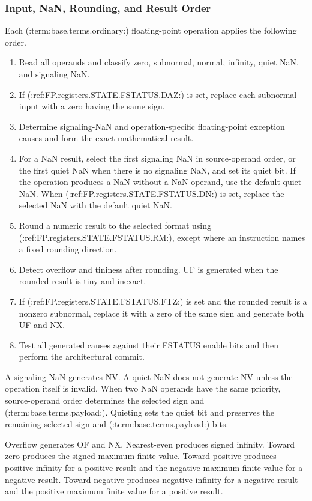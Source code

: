 \subsubsection{Input, NaN, Rounding, and Result Order}

Each (:term:base.terms.ordinary:) floating-point operation applies the following order.

\begin{enumerate}
\item Read all operands and classify zero, subnormal, normal, infinity, quiet NaN, and signaling NaN.
\item If (:ref:FP.registers.STATE.FSTATUS.DAZ:) is set, replace each subnormal input with a zero having the same sign.
\item Determine signaling-NaN and operation-specific floating-point exception causes and form the exact mathematical result.
\item For a NaN result, select the first signaling NaN in source-operand order, or the first quiet NaN when there is
no signaling NaN, and set its quiet bit. If the operation produces a NaN without a NaN operand, use the default
quiet NaN. When (:ref:FP.registers.STATE.FSTATUS.DN:) is set, replace the selected NaN with the default quiet NaN.
\item Round a numeric result to the selected format using (:ref:FP.registers.STATE.FSTATUS.RM:), except where an instruction names a
fixed rounding direction.
\item Detect overflow and tininess after rounding. UF is generated when the rounded result is tiny and inexact.
\item If (:ref:FP.registers.STATE.FSTATUS.FTZ:) is set and the rounded result is a nonzero subnormal, replace it with a zero of the
same sign and generate both UF and NX.
\item Test all generated causes against their FSTATUS enable bits and then perform the architectural commit.
\end{enumerate}

A signaling NaN generates NV. A quiet NaN does not generate NV unless the operation itself is invalid. When two
NaN operands have the same priority, source-operand order determines the selected sign and (:term:base.terms.payload:). Quieting sets
the quiet bit and preserves the remaining selected sign and (:term:base.terms.payload:) bits.

Overflow generates OF and NX. Nearest-even produces signed infinity. Toward zero produces the signed maximum finite
value. Toward positive produces positive infinity for a positive result and the negative maximum finite value for a
negative result. Toward negative produces negative infinity for a negative result and the positive maximum finite
value for a positive result.
